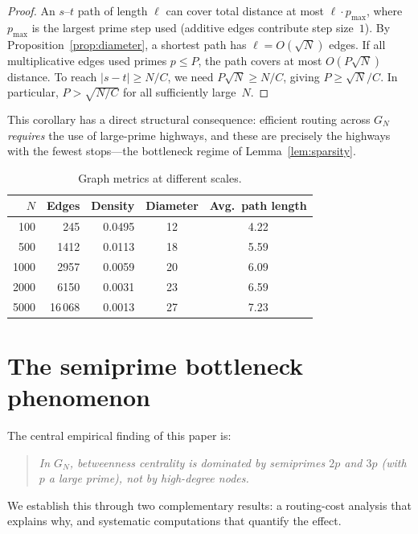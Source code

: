 \documentclass[11pt]{article}
\theoremstyle{plain}
\theoremstyle{definition}
\begin{document}
\begin{proof}
An $s$--$t$ path of length $\ell$ can cover total distance at most
$\ell \cdot p_{\max}$, where $p_{\max}$ is the largest prime step used
(additive edges contribute step size~$1$). By Proposition~\ref{prop:diameter},
a shortest path has $\ell = O(\sqrt{N})$ edges. If all multiplicative edges
used primes $p \le P$, the path covers at most $O(P \sqrt{N})$ distance.
To reach $|s - t| \ge N/C$, we need $P \sqrt{N} \ge N/C$, giving
$P \ge \sqrt{N}/C$. In particular, $P > \sqrt{N/C}$ for all
sufficiently large~$N$.
\end{proof}

This corollary has a direct structural consequence: efficient routing across $G_N$
\emph{requires} the use of large-prime highways, and these are precisely the
highways with the fewest stops---the bottleneck regime of Lemma~\ref{lem:sparsity}.

\begin{table}[ht]
\centering
\caption{Graph metrics at different scales.}\label{tab:scaling}
\begin{tabular}{@{}rrrcc@{}}
\toprule
$N$ & Edges & Density & Diameter & Avg.\ path length \\
\midrule
100 & 245 & 0.0495 & 12 & 4.22 \\
500 & 1412 & 0.0113 & 18 & 5.59 \\
1000 & 2957 & 0.0059 & 20 & 6.09 \\
2000 & 6150 & 0.0031 & 23 & 6.59 \\
5000 & 16\,068 & 0.0013 & 27 & 7.23 \\
\bottomrule
\end{tabular}
\end{table}


\section{The semiprime bottleneck phenomenon}

The central empirical finding of this paper is:

\begin{quote}
\emph{In $G_N$, betweenness centrality is dominated by semiprimes $2p$ and $3p$
(with $p$ a large prime), not by high-degree nodes.}
\end{quote}

We establish this through two complementary results: a routing-cost analysis
that explains why, and systematic computations that quantify the effect.
\end{document}
